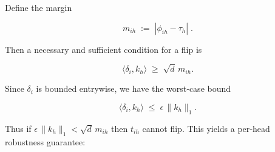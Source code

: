 Define the margin






\[






m_{ih}\;:=\;|\phi_{ih}-\tau_h|\;.






\]






Then a necessary and sufficient condition for a flip is






\begin{equation}






\label{eq:flip}






\langle \delta_{i},k_{h}\rangle \;\ge\; \sqrt{d}\,m_{ih}.






\end{equation}













Since $\delta_{i}$ is bounded entrywise, we have the worst‑case bound






\[






\langle \delta_{i},k_{h}\rangle \;\le\; \epsilon\,\|k_{h}\|_1.






\]






Thus if $\epsilon\,\|k_{h}\|_1 < \sqrt{d}\,m_{ih}$ then $t_{ih}$ cannot flip.  This yields a per‑head robustness guarantee:













